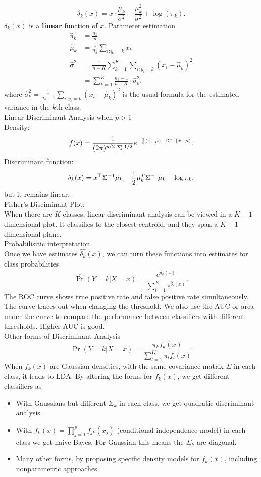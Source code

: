 \documentclass[11pt, a4paper]{article}
\begin{document}
\[
  \delta_k(x)=x\cdot \frac{\mu_k}{\sigma^2}-\frac{\mu_k^2}{\sigma^2}+\log(\pi_k).
\]
$\delta_k(x)$ is a \textbf{linear} function of $x$.
Parameter estimation
\begin{align}
  \hat{\pi}_k&=\frac{n_k}{n}\\
  \hat{\mu}_k&= \frac{1}{n_k} \sum_{i:y_i=k}x_k\\
  \hat{\sigma}^2&=\frac{1}{n-K} \sum_{k=1}^K \sum_{i:y_i=k}(x_i-\hat{\mu}_k)^2\\
 &=\sum_{k=1}^K\frac{n_k-1}{n-K}\cdot \hat{\sigma}_k^2.
\end{align}
where $\hat{\sigma}^2_k=\frac{1}{n_k-1}\sum_{i:y_i=k}(x_i-\hat{\mu}_k)^2$ is the usual formula for the estimated variance in the $k$th class.\\[1mm]
Linear Discriminant Analysis when $p>1$\\
Density: 
\[f(x)=\frac{1}{(2\pi)^{p/2}|\Sigma|^{1/2}}e^{-{1\over 2}(x-\mu)^\top\Sigma^{-1}(x-\mu)}.
\]
Discriminant function:
\[
  \delta_k(x)=x^\top\Sigma^{-1}\mu_k-{1\over 2}\mu_k^T\Sigma^{-1}\mu_k+\log\pi_k.
\]
but it remains linear.\\
Fisher's Disciminant Plot:\\
When there are $K$ classes, linear discriminant analysis can be viewed in a $K-1$ dimensional plot. It classifies to the closest centroid, and they span a $K-1$ dimensional plane.\\[1mm]
Probabilisitic interpretation\\
Once we have estimates $\hat{\delta_k}(x)$, we can turn these functions into estimates for class probabilities:
\[
 \hat{\operatorname{Pr}}(Y=k|X=x)=\frac{e^{\hat{\delta}_k(x)}}{\sum_{l=1}^Ke^{\hat{\delta}_l(x)}}.
\]
The ROC curve shows true positive rate and false positive rate simultaneously. The curve traces out when changing the threshold. We also use the AUC or area under the curve to compare the performance between classifiers with different thresholds. Higher AUC is good.\\[1mm]
Other forms of Discriminant Analysis\\
\[
  \operatorname{Pr}(Y=k|X=x)=\frac{\pi_kf_k(x)}{\sum^K_{l=1}\pi_lf_l(x)}
\]
When $f_k(x)$ are Gaussian densities, with the same covariance matrix $\Sigma$ in each class, it leads to LDA. By altering the forms for $f_k(x)$, we get different classifiers as
\begin{itemize}
  \item With Gaussians but different $\Sigma_k$ in each class, we get quadratic discriminant analysis.
  \item With $f_k(x)=\prod^p_{j=1}f_{jk}(x_j)$ (conditional independence model) in each class we get naive Bayes. For Gaussian this means the $\Sigma_k$ are diagonal.
  \item Many other forms, by proposing specific density models for $f_k(x)$, including nonparametric approaches.
  \end{itemize}
\end{document}
